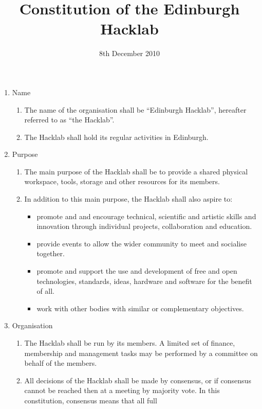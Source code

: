 \documentclass{article}
\title{Constitution of the Edinburgh Hacklab}
\date{8th December 2010}
\begin{document}
\maketitle
\begin{enumerate}
  \item Name
    \begin{enumerate}
      \item The name of the organisation shall be ``Edinburgh
        Hacklab'', hereafter referred to as ``the Hacklab''.
      \item The Hacklab shall hold its regular activities in Edinburgh.
    \end{enumerate} %
  \item Purpose
    \begin{enumerate}
    \item The main purpose of the Hacklab shall be to provide a shared
      physical workspace, tools, storage and other resources for its
      members.
      \item In addition to this main purpose, the Hacklab shall also aspire to:
        \begin{itemize}
        \item promote and and encourage technical, scientific and
          artistic skills and innovation through individual projects,
          collaboration and education.
        \item provide events to allow the wider community to meet and
          socialise together. 
          \item promote and support the use and development of free
            and open technologies, standards, ideas, hardware and
            software for the benefit of all.
          \item work with other bodies with similar or complementary
            objectives.
        \end{itemize}
    \end{enumerate} %
  \item Organisation
    \begin{enumerate}
    \item The Hacklab shall be run by its members. A limited set of
      finance, membership and management tasks may be performed by a
      committee on behalf of the members.
    \item All decisions of the Hacklab shall be made by consensus, or
      if consensus cannot be reached then at a meeting by majority
      vote. In this constitution, consensus means that all full

\end{enumerate}
\end{enumerate}
\end{document}
